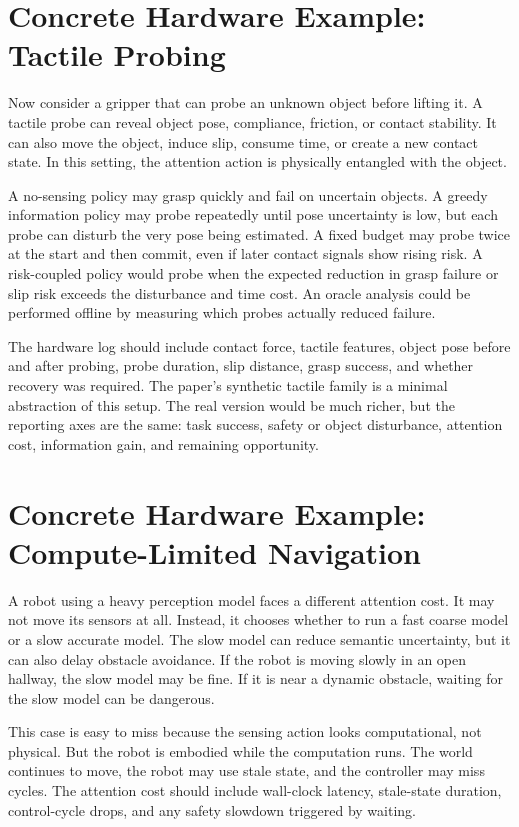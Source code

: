 \documentclass{article}
\begin{document}
\section{Concrete Hardware Example: Tactile Probing}

Now consider a gripper that can probe an unknown object before lifting it. A
tactile probe can reveal object pose, compliance, friction, or contact
stability. It can also move the object, induce slip, consume time, or create a
new contact state. In this setting, the attention action is physically
entangled with the object.

A no-sensing policy may grasp quickly and fail on uncertain objects. A greedy
information policy may probe repeatedly until pose uncertainty is low, but each
probe can disturb the very pose being estimated. A fixed budget may probe twice
at the start and then commit, even if later contact signals show rising risk.
A risk-coupled policy would probe when the expected reduction in grasp failure
or slip risk exceeds the disturbance and time cost. An oracle analysis could
be performed offline by measuring which probes actually reduced failure.

The hardware log should include contact force, tactile features, object pose
before and after probing, probe duration, slip distance, grasp success, and
whether recovery was required. The paper's synthetic tactile family is a
minimal abstraction of this setup. The real version would be much richer, but
the reporting axes are the same: task success, safety or object disturbance,
attention cost, information gain, and remaining opportunity.

\section{Concrete Hardware Example: Compute-Limited Navigation}

A robot using a heavy perception model faces a different attention cost. It
may not move its sensors at all. Instead, it chooses whether to run a fast
coarse model or a slow accurate model. The slow model can reduce semantic
uncertainty, but it can also delay obstacle avoidance. If the robot is moving
slowly in an open hallway, the slow model may be fine. If it is near a dynamic
obstacle, waiting for the slow model can be dangerous.

This case is easy to miss because the sensing action looks computational, not
physical. But the robot is embodied while the computation runs. The world
continues to move, the robot may use stale state, and the controller may miss
cycles. The attention cost should include wall-clock latency, stale-state
duration, control-cycle drops, and any safety slowdown triggered by waiting.
\end{document}
